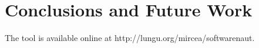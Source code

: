 \documentclass[preprint,12pt]{elsarticle}
\begin{document}
\section {Conclusions and Future Work}
\label {sec:conc}
The tool is available online at http://lungu.org/mircea/softwarenaut.























\end{document}
